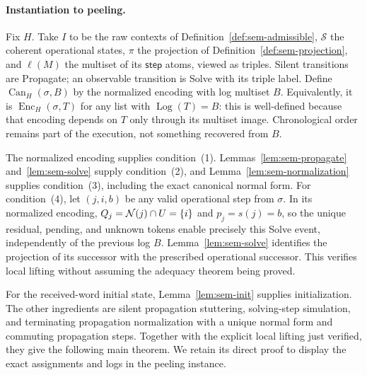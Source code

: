 \paragraph{Instantiation to peeling.}
Fix $H$. Take $I$ to be the raw contexts of
Definition~\ref{def:sem-admissible}, $\mathcal S$ the coherent operational
states, $\pi$ the projection of Definition~\ref{def:sem-projection}, and
$\ell(M)$ the multiset of its $\mathsf{step}$ atoms, viewed as triples.
Silent transitions are Propagate; an observable transition is Solve with
its triple label. Define $\operatorname{Can}_H(\sigma,B)$ by the normalized
encoding with log multiset $B$. Equivalently, it is
$\operatorname{Enc}_H(\sigma,T)$ for any list with
$\operatorname{Log}(T)=B$: this is well-defined because that encoding
depends on $T$ only through its multiset image. Chronological order remains
part of the execution, not something recovered from $B$.

The normalized encoding supplies condition~(1).
Lemmas~\ref{lem:sem-propagate} and~\ref{lem:sem-solve} supply condition~(2),
and Lemma~\ref{lem:sem-normalization} supplies condition~(3), including
the exact canonical normal form. For condition~(4), let $(j,i,b)$ be any
valid operational step from $\sigma$. In its normalized encoding,
$Q_j=\mathcal{N}(j)\cap U=\{i\}$ and $p_j=s(j)=b$, so the unique residual,
pending, and unknown tokens enable precisely this Solve event, independently
of the previous log $B$. Lemma~\ref{lem:sem-solve} identifies the projection
of its successor with the prescribed operational successor. This verifies
local lifting without assuming the adequacy theorem being proved.

For the received-word initial state, Lemma~\ref{lem:sem-init} supplies
initialization. The other ingredients are silent propagation stuttering,
solving-step simulation, and terminating propagation normalization with a
unique normal form and commuting propagation steps. Together with the
explicit local lifting just verified, they give the following main theorem.
We retain its direct proof to display the exact assignments and logs in the
peeling instance.

